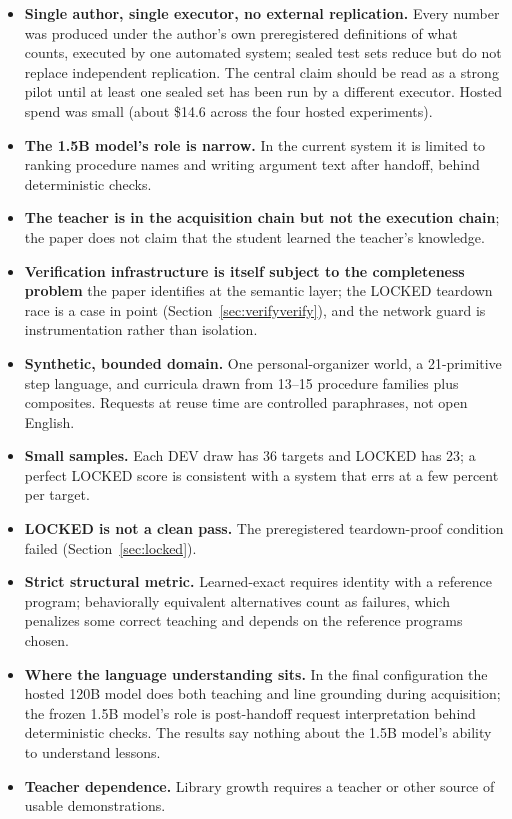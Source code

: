 \documentclass[10pt]{article}
\begin{document}
\begin{itemize}
\item \textbf{Single author, single executor, no external replication.} Every number was produced under the author's own preregistered definitions of what counts, executed by one automated system; sealed test sets reduce but do not replace independent replication. The central claim should be read as a strong pilot until at least one sealed set has been run by a different executor. Hosted spend was small (about \$14.6 across the four hosted experiments).
\item \textbf{The 1.5B model's role is narrow.} In the current system it is limited to ranking procedure names and writing argument text after handoff, behind deterministic checks.
\item \textbf{The teacher is in the acquisition chain but not the execution chain}; the paper does not claim that the student learned the teacher's knowledge.
\item \textbf{Verification infrastructure is itself subject to the completeness problem} the paper identifies at the semantic layer; the LOCKED teardown race is a case in point (Section~\ref{sec:verifyverify}), and the network guard is instrumentation rather than isolation.
\item \textbf{Synthetic, bounded domain.} One personal-organizer world, a 21-primitive step language, and curricula drawn from 13--15 procedure families plus composites. Requests at reuse time are controlled paraphrases, not open English.
\item \textbf{Small samples.} Each DEV draw has 36 targets and LOCKED has 23; a perfect LOCKED score is consistent with a system that errs at a few percent per target.
\item \textbf{LOCKED is not a clean pass.} The preregistered teardown-proof condition failed (Section~\ref{sec:locked}).
\item \textbf{Strict structural metric.} Learned-exact requires identity with a reference program; behaviorally equivalent alternatives count as failures, which penalizes some correct teaching and depends on the reference programs chosen.
\item \textbf{Where the language understanding sits.} In the final configuration the hosted 120B model does both teaching and line grounding during acquisition; the frozen 1.5B model's role is post-handoff request interpretation behind deterministic checks. The results say nothing about the 1.5B model's ability to understand lessons.
\item \textbf{Teacher dependence.} Library growth requires a teacher or other source of usable demonstrations.

\end{itemize}
\end{document}
